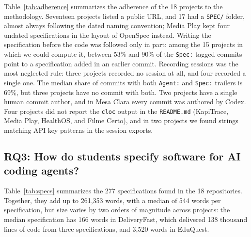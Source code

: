 \documentclass[conference]{IEEEtran}
\begin{document}
Table~\ref{tab:adherence} summarizes the adherence of the 18 projects to the methodology. Seventeen projects listed a public URL, and 17 had a \texttt{SPEC/} folder, almost always following the dated naming convention; Media Play kept four undated specifications in the layout of OpenSpec instead. Writing the specification before the code was followed only in part: among the 15 projects in which we could compute it, between 53\% and 90\% of the \texttt{Spec:}-tagged commits point to a specification added in an earlier commit. Recording sessions was the most neglected rule: three projects recorded no session at all, and four recorded a single one. The median share of commits with both \texttt{Agent:} and \texttt{Spec:} trailers is 69\%, but three projects have no commit with both. Two projects have a single human commit author, and in Mesa Clara every commit was authored by Codex. Four projects did not report the \texttt{cloc} output in the \texttt{README.md} (KapiTrace, Media Play, HealthOS, and Filme Certo), and in two projects we found strings matching API key patterns in the session exports.

\subsection{RQ3: How do students specify software for AI coding agents?}

Table~\ref{tab:specs} summarizes the 277 specifications found in the 18 repositories. Together, they add up to 261,353 words, with a median of 544 words per specification, but size varies by two orders of magnitude across projects: the median specification has 166 words in DeliveryFast, which delivered 138 thousand lines of code from three specifications, and 3,520 words in EduQuest.
\end{document}
